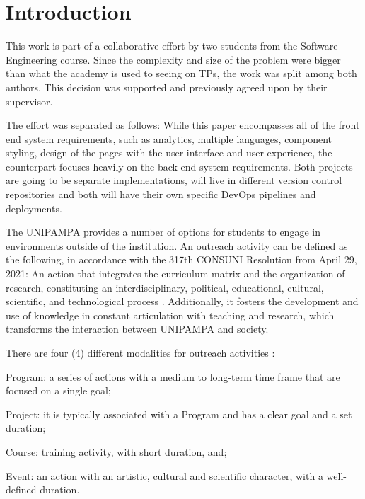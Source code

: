 \chapter{Introduction}\label{introduction}

This work is part of a collaborative effort by two students from the Software Engineering course. Since the complexity and size of the problem were bigger than what the academy is used to seeing on \acp{TP}, the work was split among both authors. This decision was supported and previously agreed upon by their supervisor.

The effort was separated as follows: While this paper encompasses all of the front end system requirements, such as analytics, multiple languages, component styling, design of the pages with the user interface and user experience, the counterpart focuses heavily on the back end system requirements. Both projects are going to be separate implementations, will live in different version control repositories and both will have their own specific DevOps pipelines and deployments.

The \acl{UNIPAMPA} provides a number of options for students to engage in environments outside of the institution. An outreach activity can be defined as the following, in accordance with the 317th CONSUNI Resolution from April 29, 2021: An action that integrates the curriculum matrix and the organization of research, constituting an interdisciplinary, political, educational, cultural, scientific, and technological process . Additionally, it fosters the development and use of knowledge in constant articulation with teaching and research, which transforms the interaction between \ac{UNIPAMPA} and society.

There are four (4) different modalities for outreach activities :
\begin{inparaenum}[(i)]
  \item Program: a series of actions with a medium to long-term time frame that are focused on a single goal;
  \item Project: it is typically associated with a Program and has a clear goal and a set duration;
  \item Course: training activity, with short duration, and;
  \item Event: an action with an artistic, cultural and scientific character, with a well-defined duration.
\end{inparaenum}

